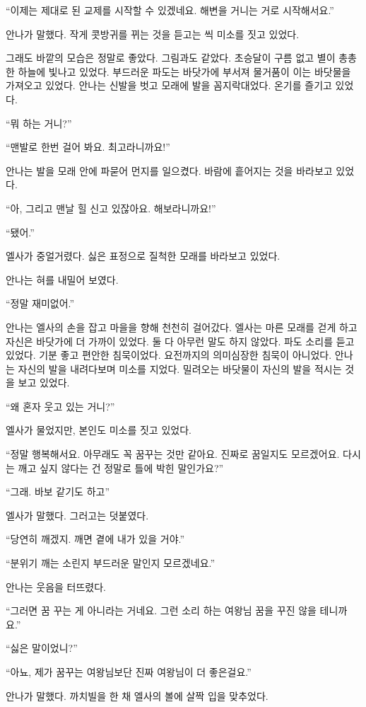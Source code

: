 ``이제는 제대로 된 교제를 시작할 수 있겠네요. 해변을 거니는 거로 시작해서요.''

안나가 말했다. 작게 콧방귀를 뀌는 것을 듣고는 씩 미소를 짓고 있었다.

그래도 바깥의 모습은 정말로 좋았다. 그림과도 같았다. 초승달이 구름 없고 별이 총총한 하늘에 빛나고 있었다. 부드러운 파도는 바닷가에 부서져 물거품이 이는 바닷물을 가져오고 있었다. 안나는 신발을 벗고 모래에 발을 꼼지락대었다. 온기를 즐기고 있었다.

``뭐 하는 거니?''

``맨발로 한번 걸어 봐요. 최고라니까요!''

안나는 발을 모래 안에 파묻어 먼지를 일으켰다. 바람에 흩어지는 것을 바라보고 있었다.

``아, 그리고 맨날 힐 신고 있잖아요. 해보라니까요!''

``됐어.''

엘사가 중얼거렸다. 싫은 표정으로 질척한 모래를 바라보고 있었다.

안나는 혀를 내밀어 보였다.

``정말 재미없어.''

안나는 엘사의 손을 잡고 마을을 향해 천천히 걸어갔다. 엘사는 마른 모래를 걷게 하고 자신은 바닷가에 더 가까이 있었다. 둘 다 아무런 말도 하지 않았다. 파도 소리를 듣고 있었다. 기분 좋고 편안한 침묵이었다. 요전까지의 의미심장한 침묵이 아니었다. 안나는 자신의 발을 내려다보며 미소를 지었다. 밀려오는 바닷물이 자신의 발을 적시는 것을 보고 있었다.

``왜 혼자 웃고 있는 거니?''

엘사가 물었지만, 본인도 미소를 짓고 있었다.

``정말 행복해서요. 아무래도 꼭 꿈꾸는 것만 같아요. 진짜로 꿈일지도 모르겠어요. 다시는 깨고 싶지 않다는 건 정말로 틀에 박힌 말인가요?''

``그래. 바보 같기도 하고''

엘사가 말했다. 그러고는 덧붙였다.

``당연히 깨겠지. 깨면 곁에 내가 있을 거야.''

``분위기 깨는 소린지 부드러운 말인지 모르겠네요.''

안나는 웃음을 터뜨렸다.

``그러면 꿈 꾸는 게 아니라는 거네요. 그런 소리 하는 여왕님 꿈을 꾸진 않을 테니까요.''

`` 싫은 말이었니?''

``아뇨, 제가 꿈꾸는 여왕님보단 진짜 여왕님이 더 좋은걸요.''

안나가 말했다. 까치빌을 한 채 엘사의 볼에 살짝 입을 맞추었다.

